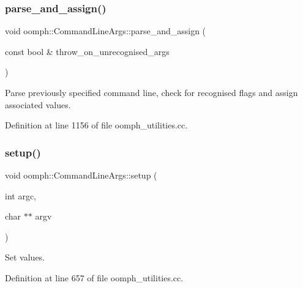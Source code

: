 \subsubsection{\texorpdfstring{parse\+\_\+and\+\_\+assign()}{parse\_and\_assign()}\hspace{0.1cm}{\footnotesize\ttfamily [2/2]}}
{\footnotesize\ttfamily void oomph\+::\+Command\+Line\+Args\+::parse\+\_\+and\+\_\+assign (\begin{DoxyParamCaption}\item[{const bool \&}]{throw\+\_\+on\+\_\+unrecognised\+\_\+args }\end{DoxyParamCaption})}



Parse previously specified command line, check for recognised flags and assign associated values. 



Definition at line 1156 of file oomph\+\_\+utilities.\+cc.

\mbox{\label{namespaceoomph_1_1CommandLineArgs_a02666c3d933af7c70da94bb0e87ebeb0}} 
\subsubsection{\texorpdfstring{setup()}{setup()}}
{\footnotesize\ttfamily void oomph\+::\+Command\+Line\+Args\+::setup (\begin{DoxyParamCaption}\item[{int}]{argc,  }\item[{char $\ast$$\ast$}]{argv }\end{DoxyParamCaption})}



Set values. 



Definition at line 657 of file oomph\+\_\+utilities.\+cc.

\mbox{\label{namespaceoomph_1_1CommandLineArgs_a4b0153b45b4b4e026b2fe767194d8088}} 
